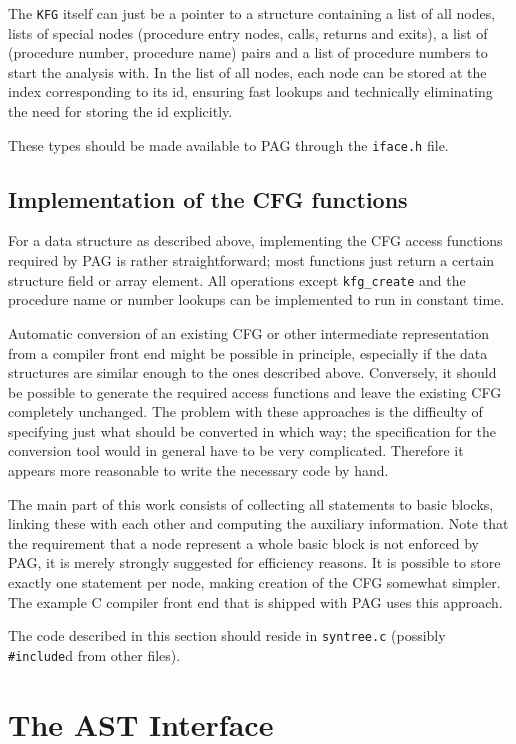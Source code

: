\documentclass[12pt]{article}
\begin{document}
The \verb|KFG| itself can just be a pointer to a structure
containing a list of all nodes, lists of special nodes (procedure
entry nodes, calls, returns and exits), a list of (procedure number,
procedure name) pairs and a list of procedure numbers to start the
analysis with. In the list of all nodes, each node can be stored at
the index corresponding to its id, ensuring fast lookups and
technically eliminating the need for storing the id explicitly.

These types should be made available to PAG through the
\verb|iface.h| file.

\subsection{Implementation of the CFG functions}

For a data structure as described above, implementing the CFG access
functions required by PAG is rather straightforward; most functions
just return a certain structure field or array element. All operations
except \verb|kfg_create| and the procedure name or number lookups
can be implemented to run in constant time.

Automatic conversion of an existing CFG or other intermediate
representation from a compiler front end might be possible in
principle, especially if the data structures are similar enough to
the ones described above. Conversely, it should be possible to
generate the required access functions and leave the existing CFG
completely unchanged. The problem with these approaches is the
difficulty of specifying just what should be converted in which way;
the specification for the conversion tool would in general have to
be very complicated. Therefore it appears more reasonable to write
the necessary code by hand.

The main part of this work consists of collecting all statements to
basic blocks, linking these with each other and computing the
auxiliary information. Note that the requirement that a node
represent a whole basic block is not enforced by PAG, it is merely
strongly suggested for efficiency reasons. It is possible to store
exactly one statement per node, making creation of the CFG somewhat
simpler. The example C compiler front end that is shipped with PAG
uses this approach.

The code described in this section should reside in \verb|syntree.c|
(possibly \verb|#include|d from other files).

\section{The AST Interface}
\end{document}
